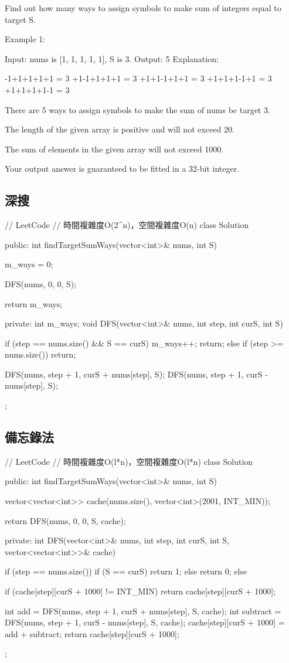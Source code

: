 Find out how many ways to assign symbols to make sum of integers equal to target S.

Example 1:
\begin{Code}
Input: nums is [1, 1, 1, 1, 1], S is 3. 
Output: 5
Explanation: 

-1+1+1+1+1 = 3
+1-1+1+1+1 = 3
+1+1-1+1+1 = 3
+1+1+1-1+1 = 3
+1+1+1+1-1 = 3

There are 5 ways to assign symbols to make the sum of nums be target 3.
\end{Code}


\begindot
\item The length of the given array is positive and will not exceed 20.
\item The sum of elements in the given array will not exceed 1000.
\item Your output answer is guaranteed to be fitted in a 32-bit integer.
\myenddot

\subsection{深搜}
\begin{Code}
// LeetCode
// 時間複雜度O(2^n)，空間複雜度O(n)
class Solution {
public:
    int findTargetSumWays(vector<int>& nums, int S) {
        m_ways = 0;

        DFS(nums, 0, 0, S);

        return m_ways;
    }
private:
    int m_ways;
    void DFS(vector<int>& nums, int step, int curS, int S)
    {
        if (step == nums.size() && S == curS)
        {
            m_ways++;
            return;
        }
        else if (step >= nums.size())
            return;

        DFS(nums, step + 1, curS + nums[step], S);
        DFS(nums, step + 1, curS - nums[step], S);
    }
};
\end{Code}


\subsection{備忘錄法}
\begin{Code}
// LeetCode
// 時間複雜度O(l*n)，空間複雜度O(l*n)
class Solution {
public:
    int findTargetSumWays(vector<int>& nums, int S) {
        vector<vector<int>> cache(nums.size(), vector<int>(2001, INT_MIN));

        return DFS(nums, 0, 0, S, cache);
    }
private:
    int DFS(vector<int>& nums, int step, int curS, int S, vector<vector<int>>& cache)
    {
        if (step == nums.size())
        {
            if (S == curS)
                return 1;
            else
                return 0;
        }
        else
        {
            if (cache[step][curS + 1000] != INT_MIN)
                return cache[step][curS + 1000];

            int add = DFS(nums, step + 1, curS + nums[step], S, cache);
            int subtract = DFS(nums, step + 1, curS - nums[step], S, cache);
            cache[step][curS + 1000] = add + subtract;
            return cache[step][curS + 1000];
        }
    }
};
\end{Code}


